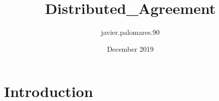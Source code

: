\documentclass{article}
\title{Distributed_Agreement}
\author{javier.palomares.90 }
\date{December 2019}
\begin{document}
\maketitle

\section{Introduction}
\end{document}
